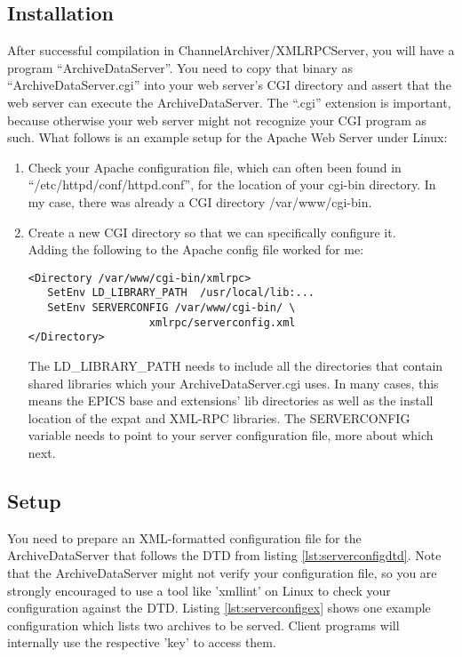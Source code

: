 \subsection{Installation} %
After successful compilation in ChannelArchiver/XMLRPCServer, you will
have a program ``ArchiveDataServer''. You need to copy that binary as
``ArchiveDataServer.cgi'' into your web server's CGI directory and
assert that the web server can execute the ArchiveDataServer.
The ``.cgi'' extension is important, because otherwise your web server
might not recognize your CGI program as such.
What follows is an example setup for the Apache Web Server under Linux:
\begin{enumerate}
\item Check your Apache configuration file, which can often been found
  in ``/etc/httpd/conf/httpd.conf'', for the location of your cgi-bin
  directory.  In my case, there was already a CGI directory /var/www/cgi-bin.

\item Create a new CGI directory so that we can specifically configure
   it.\\
   Adding the following to the Apache config file worked for me:
\begin{lstlisting}[keywordstyle=\sffamily]
<Directory /var/www/cgi-bin/xmlrpc>
   SetEnv LD_LIBRARY_PATH  /usr/local/lib:...
   SetEnv SERVERCONFIG /var/www/cgi-bin/ \
                   xmlrpc/serverconfig.xml
</Directory>
\end{lstlisting}
  The LD\_LIBRARY\_PATH needs to include all the directories that
  contain shared libraries which your ArchiveDataServer.cgi uses.
  In many cases, this means the EPICS base and extensions' lib
  directories as well as the install location of the expat and XML-RPC
  libraries.
  The SERVERCONFIG variable needs to point to your server configuration
   file, more about which next.
\end{enumerate}

\subsection{Setup}
You need to prepare an XML-formatted configuration file for the
ArchiveDataServer that follows the DTD from listing
\ref{lst:serverconfigdtd}. Note that the ArchiveDataServer might not
verify your configuration file, so you are strongly encouraged to use a
tool like 'xmllint' on Linux to check your configuration against the
DTD. Listing \ref{lst:serverconfigex} shows one example
configuration which lists two archives to be served. Client programs
will internally use the respective 'key' to access them.



